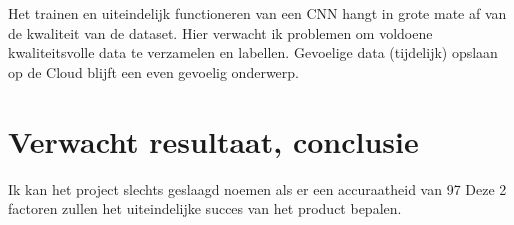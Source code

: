 Het trainen en uiteindelijk functioneren van een CNN hangt in grote mate af van de kwaliteit van de dataset. Hier verwacht ik problemen om voldoene kwaliteitsvolle data te verzamelen en labellen.
Gevoelige data (tijdelijk) opslaan op de Cloud blijft een even gevoelig onderwerp.
\section{Verwacht resultaat, conclusie}%
\label{sec:verwachte_resultaten}

Ik kan het project slechts geslaagd noemen als er een accuraatheid van 97%
Deze 2 factoren zullen het uiteindelijke succes van het product bepalen.